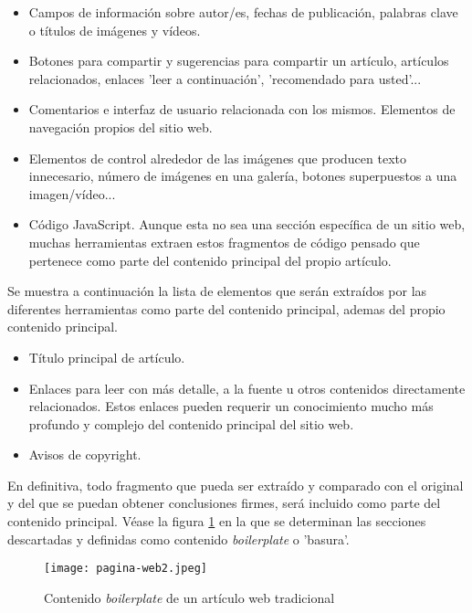 \begin{itemize}
  \item Campos de información sobre autor/es, fechas de publicación, palabras clave o títulos de imágenes 
  y vídeos.
  \item Botones para compartir y sugerencias para compartir un artículo, artículos relacionados, enlaces 
  'leer a continuación', 'recomendado para usted'...
  \item Comentarios e interfaz de usuario relacionada con los mismos. Elementos de navegación propios del
  sitio web.
  \item Elementos de control alrededor de las imágenes que producen texto innecesario, número de imágenes
  en una galería, botones superpuestos a una imagen/vídeo...
  \item Código JavaScript. Aunque esta no sea una sección específica de un sitio web, muchas herramientas
  extraen estos fragmentos de código pensado que pertenece como parte del contenido principal del propio 
  artículo.
\end{itemize}

Se muestra a continuación la lista de elementos que serán extraídos por las diferentes herramientas como
parte del contenido principal, ademas del propio contenido principal.

\begin{itemize}
  \item Título principal de artículo.
  \item Enlaces para leer con más detalle, a la fuente u otros contenidos directamente relacionados. Estos 
  enlaces pueden requerir un conocimiento mucho más profundo y complejo del contenido principal del sitio 
  web.
  \item Avisos de copyright.
\end{itemize}

En definitiva, todo fragmento que pueda ser extraído y comparado con el original y del que se puedan obtener 
conclusiones firmes, será incluido como parte del contenido principal. Véase la figura 
\ref{img:contenido boilerplate de un articulo web tradicional} en la que se determinan las secciones 
descartadas y definidas como contenido \emph{boilerplate} o 'basura'.

\begin{figure}[tphb]
  \centering
  \texttt{[image: pagina-web2.jpeg]}
  \caption{Contenido \emph{boilerplate} de un artículo web tradicional}
  \label{img:contenido boilerplate de un articulo web tradicional}
\end{figure}

